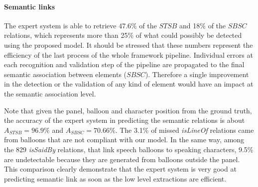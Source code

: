 
\paragraph{Semantic links} %
\label{sec:semantic_links_evaluation}

The expert system is able to retrieve 47.6\% of the $STSB$ and 18\% of the $SBSC$ relations, which represents more than 25\% of what could possibly be detected using the proposed model.
It should be stressed that these numbers represent the efficiency of the last process of the whole framework pipeline.
Individual errors at each recognition and validation step of the pipeline are propagated to the final semantic association between elements ($SBSC$).
Therefore a single improvement in the detection or the validation of any kind of element would have an impact at the semantic association level.

Note that given the panel, balloon and character position from the ground truth, the accuracy of the expert system in predicting the semantic relations is about $A_{STSB}=96.9\%$ and $A_{SBSC}=70.66\%$.
The 3.1\% of missed \emph{isLineOf} relations came from balloons that are not compliant with our model.
In the same way, among the 829 \emph{isSaidBy} relations, that link speech balloons to speaking characters, 9.5\% are undetectable because they are generated from balloons outside the panel.
This comparison clearly demonstrate that the expert system is very good at predicting semantic link as soon as the low level extractions are efficient.










